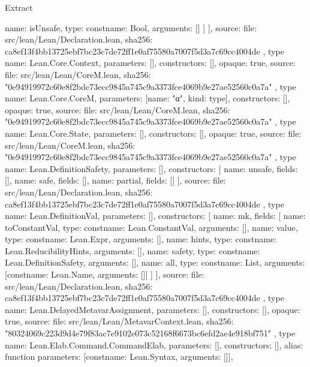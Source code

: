 \begin{lexlean}{Extract}
\begin{toolingmodule}
{{{            {name: isUnsafe, type: const{name: Bool, arguments: []}}
          ]
        }
      ],
      source: {
        file: src/lean/Lean/Declaration.lean,
        sha256: ca8ef13f4bb13725ebf7bc23c7de72ff1e0af75580a7007f5d3a7c69cc4004de
      }
    },
    type{
      name: Lean.Core.Context,
      parameters: [],
      constructors: [],
      opaque: true,
      source: {
        file: src/lean/Lean/CoreM.lean,
        sha256: "0e94919972c60e8f2bdc73ecc9845a745c9a3373fce4069b9e27ae52560c0a7a"
      }
    },
    type{
      name: Lean.Core.CoreM,
      parameters: [{name: "α", kind: type{}}],
      constructors: [],
      opaque: true,
      source: {
        file: src/lean/Lean/CoreM.lean,
        sha256: "0e94919972c60e8f2bdc73ecc9845a745c9a3373fce4069b9e27ae52560c0a7a"
      }
    },
    type{
      name: Lean.Core.State,
      parameters: [],
      constructors: [],
      opaque: true,
      source: {
        file: src/lean/Lean/CoreM.lean,
        sha256: "0e94919972c60e8f2bdc73ecc9845a745c9a3373fce4069b9e27ae52560c0a7a"
      }
    },
    type{
      name: Lean.DefinitionSafety,
      parameters: [],
      constructors: [
        {name: unsafe, fields: []},
        {name: safe, fields: []},
        {name: partial, fields: []}
      ],
      source: {
        file: src/lean/Lean/Declaration.lean,
        sha256: ca8ef13f4bb13725ebf7bc23c7de72ff1e0af75580a7007f5d3a7c69cc4004de
      }
    },
    type{
      name: Lean.DefinitionVal,
      parameters: [],
      constructors: [
        {
          name: mk,
          fields: [
            {name: toConstantVal, type: const{name: Lean.ConstantVal, arguments: []}},
            {name: value, type: const{name: Lean.Expr, arguments: []}},
            {name: hints, type: const{name: Lean.ReducibilityHints, arguments: []}},
            {name: safety, type: const{name: Lean.DefinitionSafety, arguments: []}},
            {name: all, type: const{name: List, arguments: [const{name: Lean.Name, arguments: []}]}}
          ]
        }
      ],
      source: {
        file: src/lean/Lean/Declaration.lean,
        sha256: ca8ef13f4bb13725ebf7bc23c7de72ff1e0af75580a7007f5d3a7c69cc4004de
      }
    },
    type{
      name: Lean.DelayedMetavarAssignment,
      parameters: [],
      constructors: [],
      opaque: true,
      source: {
        file: src/lean/Lean/MetavarContext.lean,
        sha256: "80324069c223d9d4e79f83ac7e9102e073c52168f6673bc6efd2ae4e918bf751"
      }
    },
    type{
      name: Lean.Elab.Command.CommandElab,
      parameters: [],
      constructors: [],
      alias: function{
        parameters: [const{name: Lean.Syntax, arguments: []}],
}}}
\end{toolingmodule}
\end{lexlean}
